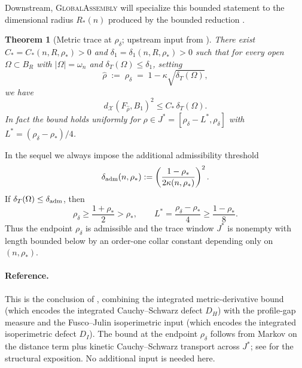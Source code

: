 \documentclass[11pt]{article}
\newtheorem{theorem}{Theorem}[section]
\theoremstyle{definition}
\newcommand{\Om}{\Omega}
\newcommand{\rstar}{\rho_{*}}
\newcommand{\rhad}{\widehat\rho}
\newcommand{\X}{\mathcal X}
\begin{document}
Downstream, \textsc{GlobalAssembly} will specialize this bounded
statement to the dimensional radius $R_*(n)$ produced by the bounded
reduction \cite{BDV-BoundedReduction-Plan1}.

\begin{theorem}[Metric trace at $\rho_\delta$; upstream input from \cite{WeightedMetricTrace}]
\label{thm:metric-trace}
There exist $C_*=C_*(n,R,\rstar)>0$ and
$\delta_1=\delta_1(n,R,\rstar)>0$ such that for every open
$\Om\subset B_R$ with $|\Om|=\omega_n$ and
$\delta_T(\Om)\le\delta_1$, setting
\begin{equation}\label{eq:rhad-window}
\rhad\;:=\;\rho_\delta\;=\;1-\kappa\sqrt{\delta_T(\Om)},
\end{equation}
we have
\begin{equation}\label{eq:metric-trace}
d_{\X}(F_{\rhad},B_1)^{2}\le C_*\,\delta_T(\Om).
\end{equation}
In fact the bound holds uniformly for $\rho\in J^*=[\rho_\delta-L^*,\rho_\delta]$
with $L^*=(\rho_\delta-\rstar)/4$.
\end{theorem}

In the sequel we always impose the additional admissibility threshold
\begin{equation}\label{eq:delta-adm}
  \delta_{\rm adm}(n,\rstar)
  :=\left(\frac{1-\rstar}{2\kappa(n,\rstar)}\right)^2 .
\end{equation}
If $\delta_T(\Om)\le\delta_{\rm adm}$, then
\begin{equation}\label{eq:rho-adm}
  \rho_\delta\ge\frac{1+\rstar}{2}>\rstar,
  \qquad
  L^*=\frac{\rho_\delta-\rstar}{4}\ge\frac{1-\rstar}{8}.
\end{equation}
Thus the endpoint $\rho_\delta$ is admissible and the trace window
$J^*$ is nonempty with length bounded below by an order-one collar
constant depending only on $(n,\rstar)$.

\paragraph{Reference.}
This is the conclusion of \cite[Thm.~5.6, Cor.~5.7]{WeightedMetricTrace},
combining the integrated metric-derivative bound
\cite[(4.2)]{WeightedMetricTrace} (which encodes the integrated
Cauchy--Schwarz defect $D_H$) with the profile-gap measure
\cite[(5.1)]{LevelSetIdentity} and the Fusco--Julin
isoperimetric input \cite[Lemma~3.1]{WeightedMetricTrace}
(which encodes the integrated isoperimetric defect $D_I$).  The bound
at the endpoint $\rho_\delta$ follows from Markov on the distance term
plus kinetic Cauchy--Schwarz transport across $J^*$; see
\cite[Rem.~5.7]{WeightedMetricTrace} for the structural exposition.
No additional input is needed here.
\end{document}

